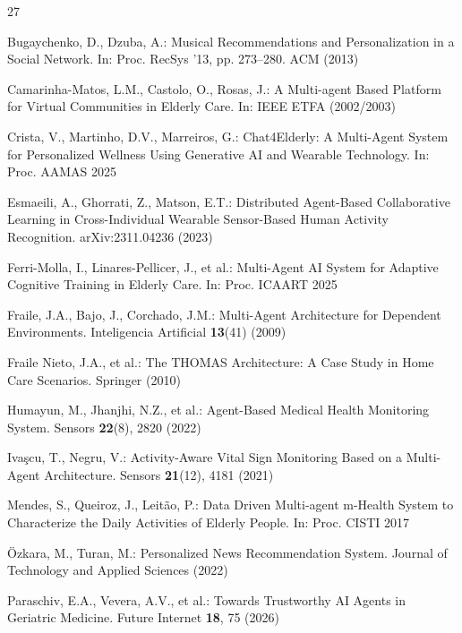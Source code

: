 \documentclass[runningheads]{llncs}
\begin{document}
%
%
%
% 
% 
%
\begin{thebibliography}{27}

Bugaychenko, D., Dzuba, A.: Musical Recommendations and Personalization in a Social Network. In: Proc. RecSys '13, pp. 273--280. ACM (2013)

Camarinha-Matos, L.M., Castolo, O., Rosas, J.: A Multi-agent Based Platform for Virtual Communities in Elderly Care. In: IEEE ETFA (2002/2003)

Crista, V., Martinho, D.V., Marreiros, G.: Chat4Elderly: A Multi-Agent System for Personalized Wellness Using Generative AI and Wearable Technology. In: Proc. AAMAS 2025

Esmaeili, A., Ghorrati, Z., Matson, E.T.: Distributed Agent-Based Collaborative Learning in Cross-Individual Wearable Sensor-Based Human Activity Recognition. arXiv:2311.04236 (2023)

Ferri-Molla, I., Linares-Pellicer, J., et al.: Multi-Agent AI System for Adaptive Cognitive Training in Elderly Care. In: Proc. ICAART 2025

Fraile, J.A., Bajo, J., Corchado, J.M.: Multi-Agent Architecture for Dependent Environments. Inteligencia Artificial \textbf{13}(41) (2009)

Fraile Nieto, J.A., et al.: The THOMAS Architecture: A Case Study in Home Care Scenarios. Springer (2010)

Humayun, M., Jhanjhi, N.Z., et al.: Agent-Based Medical Health Monitoring System. Sensors \textbf{22}(8), 2820 (2022)

Iva\c{s}cu, T., Negru, V.: Activity-Aware Vital Sign Monitoring Based on a Multi-Agent Architecture. Sensors \textbf{21}(12), 4181 (2021)

Mendes, S., Queiroz, J., Leit\~{a}o, P.: Data Driven Multi-agent m-Health System to Characterize the Daily Activities of Elderly People. In: Proc. CISTI 2017

\"{O}zkara, M., Turan, M.: Personalized News Recommendation System. Journal of Technology and Applied Sciences (2022)

Paraschiv, E.A., Vevera, A.V., et al.: Towards Trustworthy AI Agents in Geriatric Medicine. Future Internet \textbf{18}, 75 (2026)


\end{thebibliography}
\end{document}
